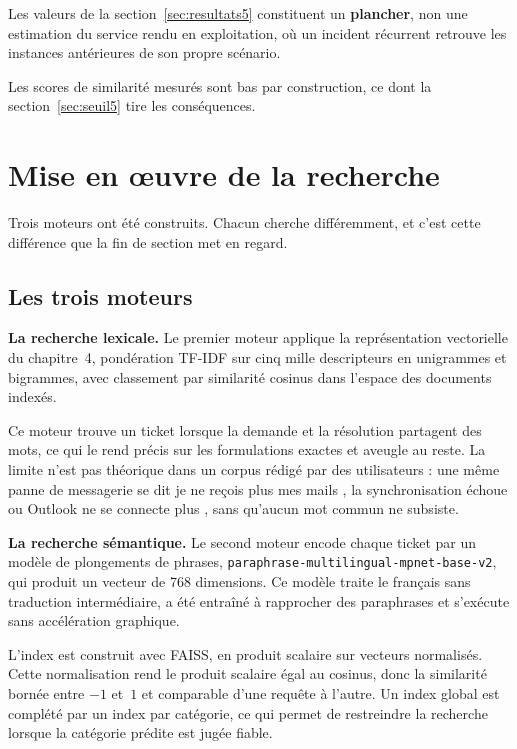 \begin{puces}
  \item Les valeurs de la section~\ref{sec:resultats5} constituent un \textbf{plancher}, non une
        estimation du service rendu en exploitation, où un incident récurrent retrouve les
        instances antérieures de son propre scénario.
  \item Les scores de similarité mesurés sont bas par construction, ce dont la
        section~\ref{sec:seuil5} tire les conséquences.
\end{puces}

\section{Mise en œuvre de la recherche}

Trois moteurs ont été construits. Chacun cherche différemment, et c'est cette différence
que la fin de section met en regard.

\subsection{Les trois moteurs}

\textbf{La recherche lexicale.} Le premier moteur applique la représentation vectorielle du chapitre~4, pondération TF-IDF sur cinq
mille descripteurs en unigrammes et bigrammes, avec classement par similarité cosinus dans l'espace
des documents indexés.

Ce moteur trouve un ticket lorsque la demande et la résolution partagent des mots, ce qui le rend
précis sur les formulations exactes et aveugle au reste. La limite n'est pas théorique dans un
corpus rédigé par des utilisateurs : une même panne de messagerie se dit \og je ne reçois plus mes
mails \fg{}, \og la synchronisation échoue \fg{} ou \og Outlook ne se connecte plus \fg{}, sans
qu'aucun mot commun ne subsiste.

\textbf{La recherche sémantique.} Le second moteur encode chaque ticket par un modèle de plongements de phrases,
\texttt{paraphrase-multilingual-mpnet-base-v2}, qui produit un vecteur de 768 dimensions. Ce modèle
traite le français sans traduction intermédiaire, a été entraîné à rapprocher des paraphrases et
s'exécute sans accélération graphique.

L'index est construit avec FAISS, en produit scalaire sur vecteurs normalisés. Cette normalisation
rend le produit scalaire égal au cosinus, donc la similarité bornée entre $-1$ et~$1$ et comparable
d'une requête à l'autre. Un index global est complété par un index par catégorie, ce qui permet de
restreindre la recherche lorsque la catégorie prédite est jugée fiable.

